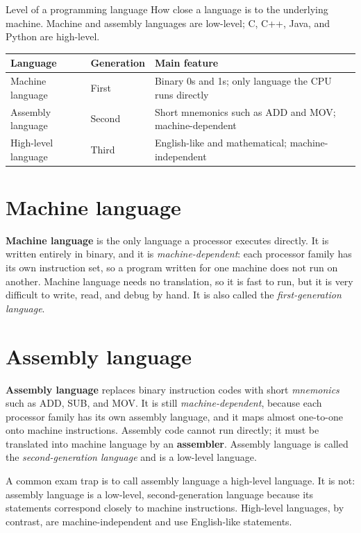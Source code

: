 \begin{definitionbox}{Level of a programming language}
How close a language is to the underlying machine. Machine and assembly
languages are low-level; C, C++, Java, and Python are high-level.
\end{definitionbox}

\begin{center}
\begin{tabular}{p{}p{}p{}}
\toprule
\textbf{Language} & \textbf{Generation} & \textbf{Main feature} \\
\midrule
Machine language & First & Binary 0s and 1s; only language the CPU runs directly \\
Assembly language & Second & Short mnemonics such as ADD and MOV; machine-dependent \\
High-level language & Third & English-like and mathematical; machine-independent \\
\bottomrule
\end{tabular}
\end{center}

\section{Machine language}
\textbf{Machine language} is the only language a processor executes directly.
It is written entirely in binary, and it is \emph{machine-dependent}: each
processor family has its own instruction set, so a program written for one
machine does not run on another. Machine language needs no translation, so it
is fast to run, but it is very difficult to write, read, and debug by hand. It
is also called the \emph{first-generation language}.

\section{Assembly language}
\textbf{Assembly language} replaces binary instruction codes with short
\emph{mnemonics} such as ADD, SUB, and MOV. It is still
\emph{machine-dependent}, because each processor family has its own assembly
language, and it maps almost one-to-one onto machine instructions. Assembly
code cannot run directly; it must be translated into machine language by an
\textbf{assembler}. Assembly language is called the \emph{second-generation
language} and is a low-level language.

A common exam trap is to call assembly language a high-level language. It is
not: assembly language is a low-level, second-generation language because its
statements correspond closely to machine instructions. High-level languages,
by contrast, are machine-independent and use English-like statements.

